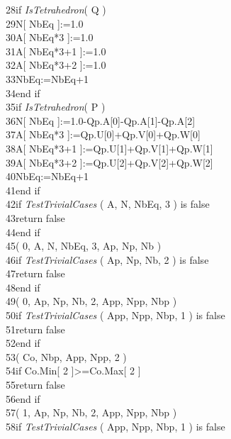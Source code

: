 \documentclass[12pt, a4paper]{article}
\begin{document}
\begin{ttfamily}
28\quad\quad if {\em IsTetrahedron}( Q )\\
29\quad\quad\quad N[ NbEq ]:=1.0\\
30\quad\quad\quad A[ NbEq*3 ]:=1.0\\
31\quad\quad\quad A[ NbEq*3+1 ]:=1.0\\
32\quad\quad\quad A[ NbEq*3+2 ]:=1.0\\
33\quad\quad\quad NbEq:=NbEq+1\\
34\quad\quad end if\\
35\quad\quad if {\em IsTetrahedron}( P )\\
36\quad\quad\quad N[ NbEq ]:=1.0-Qp.A[0]-Qp.A[1]-Qp.A[2]\\
37\quad\quad\quad A[ NbEq*3 ]:=Qp.U[0]+Qp.V[0]+Qp.W[0]\\
38\quad\quad\quad A[ NbEq*3+1 ]:=Qp.U[1]+Qp.V[1]+Qp.W[1]\\
39\quad\quad\quad A[ NbEq*3+2 ]:=Qp.U[2]+Qp.V[2]+Qp.W[2]\\
40\quad\quad\quad NbEq:=NbEq+1\\
41\quad\quad end if\\
42\quad\quad if {\em TestTrivialCases} ( A, N, NbEq, 3 ) is false\\
43\quad\quad\quad return false\\
44\quad\quad end if\\
45\quad{}( 0, A, N, NbEq, 3, Ap, Np, Nb )\\
46\quad\quad if {\em TestTrivialCases} ( Ap, Np, Nb, 2 ) is false\\
47\quad\quad\quad return false\\
48\quad\quad end if\\
49\quad{}( 0, Ap, Np, Nb, 2, App, Npp, Nbp )\\
50\quad\quad if {\em TestTrivialCases} ( App, Npp, Nbp, 1 ) is false\\
51\quad\quad\quad return false\\
52\quad\quad end if\\
53\quad{}( Co, Nbp, App, Npp, 2 )\\
54\quad\quad if Co.Min[ 2 ]>=Co.Max[ 2 ]\\
55\quad\quad\quad return false\\
56\quad\quad end if\\
57\quad{}( 1, Ap, Np, Nb, 2, App, Npp, Nbp )\\
58\quad\quad if {\em TestTrivialCases} ( App, Npp, Nbp, 1 ) is false\\

\end{ttfamily}
\end{document}
